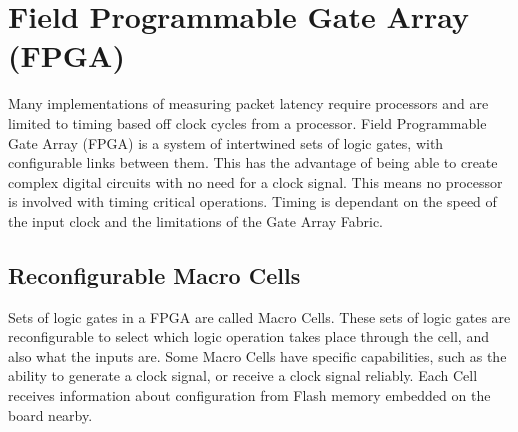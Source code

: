 \section{Field Programmable Gate Array (FPGA)}

\par Many implementations of measuring packet latency require processors and are limited to timing based off clock cycles from a processor.
Field Programmable Gate Array (FPGA) is a system of intertwined sets of logic gates, with configurable links between them.
This has the advantage of being able to create complex digital circuits with no need for a clock signal.
This means no processor is involved with timing critical operations.
Timing is dependant on the speed of the input clock and the limitations of the Gate Array Fabric.

\subsection{Reconfigurable Macro Cells}

\par Sets of logic gates in a FPGA are called Macro Cells. 
These sets of logic gates are reconfigurable to select which logic operation takes place through the cell, and also what the inputs are.
Some Macro Cells have specific capabilities, such as the ability to generate a clock signal, or receive a clock signal reliably.
Each Cell receives information about configuration from Flash memory embedded on the board nearby.
